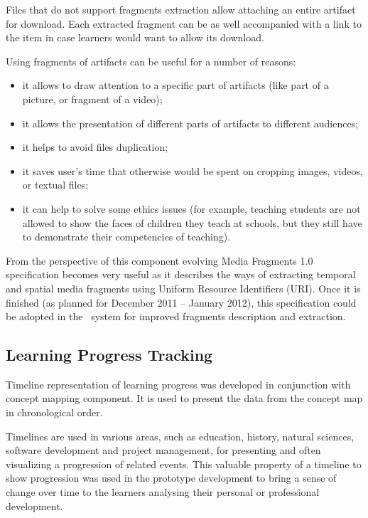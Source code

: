 Files that do not support fragments extraction allow attaching an entire
artifact for download. Each extracted fragment can be as well accompanied with a
link to the item in case learners would want to allow its download.

Using fragments of artifacts can be useful for a number of reasons:
\begin{itemize}
  \item it allows to draw attention to a specific part of artifacts (like part
  of a picture, or fragment of a video);
  \item it allows the presentation of different parts of artifacts to different
  audiences;
  \item it helps to avoid files duplication;
  \item it saves user's time that otherwise would be spent on cropping images,
  videos, or textual files;
  \item it can help to solve some ethics issues (for example, teaching students
  are not allowed to show the faces of children they teach at schools, but they
  still have to demonstrate their competencies of teaching).
\end{itemize}

From the perspective of this component evolving Media Fragments 1.0
specification \citep{MediaGroup2011} becomes very useful as it describes the
ways of extracting temporal and spatial media fragments using Uniform Resource
Identifiers (URI). Once it is finished (as planned for December 2011 -- January
2012), this specification could be adopted in the \ep~system for improved
fragments description and extraction.

\subsection{Learning Progress Tracking}
\label{sec:timeline}

Timeline representation of learning progress was developed in conjunction with
concept mapping component. It is used to present the data from the concept map
in chronological order.

Timelines are used in various areas, such as education, history, natural
sciences, software development and project management, for presenting and often
visualizing a progression of related events. This valuable property of a
timeline to show progression was used in the prototype development to bring a
sense of change over time to the learners analysing their personal or professional
development.

